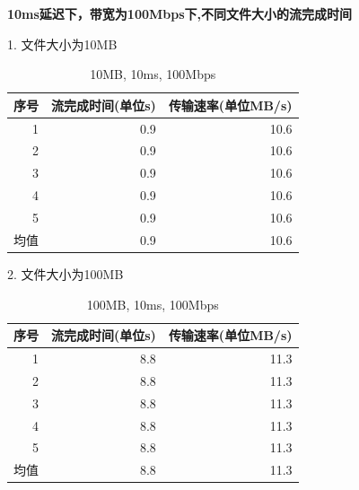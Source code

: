\documentclass[11pt]{article}
\begin{document}
\textbf{10ms延迟下，带宽为100Mbps下,不同文件大小的流完成时间}

1. 文件大小为10MB
\begin{table}[htbp]
  \centering
  \caption{10MB, 10ms, 100Mbps}
    \begin{tabular}{|l|r|r|}
    \hline
    序号    & \multicolumn{1}{l|}{流完成时间(单位s)} & \multicolumn{1}{l|}{传输速率(单位MB/s)} \bigstrut\\
    \hline
    \multicolumn{1}{|r|}{1} & 0.9   & 10.6 \bigstrut\\
    \hline
    \multicolumn{1}{|r|}{2} & 0.9   & 10.6 \bigstrut\\
    \hline
    \multicolumn{1}{|r|}{3} & 0.9   & 10.6 \bigstrut\\
    \hline
    \multicolumn{1}{|r|}{4} & 0.9   & 10.6 \bigstrut\\
    \hline
    \multicolumn{1}{|r|}{5} & 0.9   & 10.6 \bigstrut\\
    \hline
    均值    & 0.9   & 10.6 \bigstrut\\
    \hline
    \end{tabular}%
\end{table}%

\newpage

2. 文件大小为100MB

\begin{table}[htbp]
  \centering
  \caption{100MB, 10ms, 100Mbps}
    \begin{tabular}{|l|r|r|}
    \hline
    序号    & \multicolumn{1}{l|}{流完成时间(单位s)} & \multicolumn{1}{l|}{传输速率(单位MB/s)} \bigstrut\\
    \hline
    \multicolumn{1}{|r|}{1} & 8.8   & 11.3 \bigstrut\\
    \hline
    \multicolumn{1}{|r|}{2} & 8.8   & 11.3 \bigstrut\\
    \hline
    \multicolumn{1}{|r|}{3} & 8.8   & 11.3 \bigstrut\\
    \hline
    \multicolumn{1}{|r|}{4} & 8.8   & 11.3 \bigstrut\\
    \hline
    \multicolumn{1}{|r|}{5} & 8.8   & 11.3 \bigstrut\\
    \hline
    均值    & 8.8   & 11.3 \bigstrut\\
    \hline
    \end{tabular}%
  
\end{table}%
\end{document}
